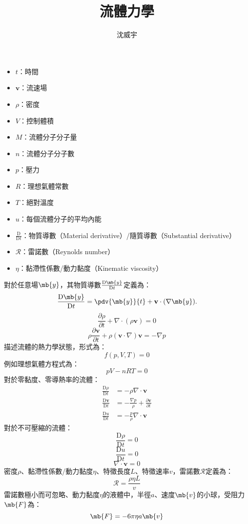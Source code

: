 \documentclass[a4paper,12pt]{article}
\begin{document}
\title{流體力學}
\author{沈威宇}
\date{\temtoday}
\titletocdoc
{}
\begin{itemize}
\item $t$：時間
\item $\mathbf{v}$：流速場
\item $\rho$：密度
\item $V$：控制體積
\item $M$：流體分子分子量
\item $n$：流體分子分子數
\item $p$：壓力
\item $R$：理想氣體常數
\item $T$：絕對溫度
\item $u$：每個流體分子的平均內能
\item $\frac{\mathrm{D}}{\mathrm{D}t}$：物質導數（Material derivative）/隨質導數（Substantial derivative）
\item $\mathscr{R}$：雷諾數（Reynolds number）
\item $\eta$：黏滯性係數/動力黏度（Kinematic viscosity）
\end{itemize}
對於任意場$\mb{y}$，其物質導數$\frac{\mathrm{D}\mb{y}}{\mathrm{D}t}$定義為：
\[\frac{\mathrm{D}\mb{y}}{\mathrm{D}t}=\pdv{\mb{y}}{t}+\mathbf{v}\cdot(\nabla \mb{y}).\]
\[\frac{\partial\rho}{\partial t}+\nabla\cdot(\rho\mathbf{v})=0\]
\[\rho\frac{\partial\mathbf{v}}{\partial t}+\rho(\mathbf{v}\cdot\nabla)\mathbf{v}=-\nabla p\]
描述流體的熱力學狀態，形式為：
\[f(p,V,T)=0\]
例如理想氣體方程式為：
\[pV-nRT=0\]
對於零黏度、零導熱率的流體：
\[\begin{aligned}
\frac{\mathrm{D}\rho}{\mathrm{D}t}&=-\rho\nabla\cdot\mathbf {v}\\
\frac{\mathrm{D}\mathbf{v}}{\mathrm{D}t}&=-\frac{\nabla p}{\rho}+\frac{\partial\mathbf{v}}{\partial t}\\
\frac{\mathrm{D}u}{\mathrm{D}t}&=-\frac{p}{\rho}\nabla\cdot\mathbf{v}
\end{aligned}\]
對於不可壓縮的流體：
\[\frac{\mathrm{D}\rho}{\mathrm{D}t}=0\]
\[\frac{\mathrm{D}u}{\mathrm{D}t}=0\]
\[\nabla\cdot\mathbf{v}=0\]
密度$\rho$、黏滯性係數/動力黏度$\eta$、特徵長度$L$、特徵速率$v$，雷諾數$\mathscr{R}$定義為：
\[\mathscr{R}=\frac{\rho\eta L}{v}\]
雷諾數極小而可忽略、動力黏度$\eta$的液體中，半徑$a$、速度$\mb{v}$的小球，受阻力$\mb{F}$為：
\[\mb{F}=-6\pi\eta a\mb{v}\]
\end{document}
